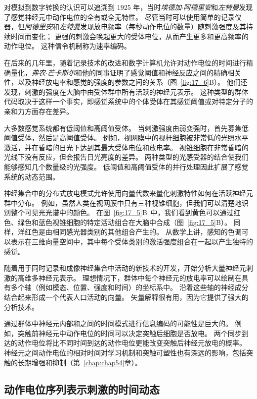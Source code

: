 对模拟到数字转换的认识可以追溯到 1925 年，当时\textit{埃德加$\cdot$阿德里安}和\textit{左特曼}发现了感觉神经元中动作电位的全有或全无特性。 
尽管当时可以使用简单的记录仪器，但\textit{阿德里安}和\textit{左特曼}发现放电频率（每秒动作电位的数量）随刺激强度及其持续时间而变化； 
更强的刺激会唤起更大的受体电位，从而产生更多和更高频率的动作电位。 
这种信令机制称为速率编码。


在后来的几年里，随着记录技术的改进和数字计算机允许对动作电位的时间进行精确量化，\textit{弗农$\cdot$芒卡斯尔}和他的同事证明了感觉阈值和神经反应之间的精确相关性，以及神经放电率和感觉的强度的参数之间的关系（图~\ref{fig:17_6}B）。
他们还发现，刺激的强度在大脑中由受体群中所有活跃的神经元表示。
这种类型的群体代码取决于这样一个事实，即感觉系统中的个体受体在其感觉阈值或对特定分子的亲和力方面存在差异。


大多数感觉系统都有低阈值和高阈值受体。 
当刺激强度由弱变强时，首先募集低阈值受体，然后是高阈值受体。 
例如，视网膜中的视杆细胞被非常低的光照水平激活，并在昏暗的日光下达到其最大受体电位和放电率。 
视锥细胞在非常昏暗的光线下没有反应，但会报告日光亮度的差异。 
两种类型的光感受器的结合使我们能够感知几个数量级的光强度。 
低阈值和高阈值受体的并行处理因此扩展了感觉系统的动态范围。


神经集合中的分布式放电模式允许使用向量代数来量化刺激特性如何在活跃神经元群中分布。 
例如，虽然人类在视网膜中只有三种视锥细胞，但我们可以清楚地识别整个可见光光谱中的颜色。 
在图~\ref{fig:17_5}B~中，我们看到黄色可以通过红色、绿色和蓝色视锥细胞的特定活动组合在大脑中合成（图~\ref{fig:17_5}B）。 
同样，洋红色是由相同感光器类别的其他组合产生的。 
从数学上讲，感知的色调可以表示在三维向量空间中，其中每个受体类别的激活强度组合在一起以产生独特的感觉。


随着用于同时记录和成像神经集合中活动的新技术的开发，开始分析大量神经元刺激的高维多神经元表示。
理想情况下，群体中每个神经元的放电率可以绘制在具有多个轴（例如模态、位置、强度和时间）的坐标系中。
沿着这些轴的神经成分结合起来形成一个代表人口活动的向量。
矢量解释很有用，因为它提供了强大的分析技术。


通过群体中神经元内部和之间的时间模式进行信息编码的可能性是巨大的。
例如，突触前神经元中动作电位的时间可以决定突触后细胞是否放电。
两个同步到达的动作电位将比不同时间到达的动作电位更能改变突触后神经元放电的概率。
神经元之间动作电位的相对时间对学习机制和突触可塑性也有深远的影响，包括突触的长期增强和抑制（第~\ref{chap:chap54}章）。



\subsection{动作电位序列表示刺激的时间动态}

